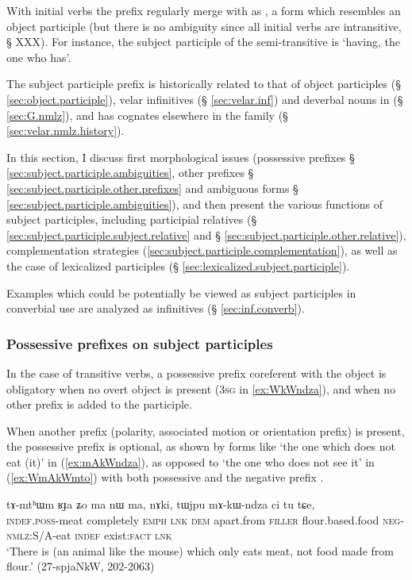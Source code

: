 With  initial verbs the  prefix regularly merge with  as , a form which resembles an object participle (but there is no ambiguity since all  initial verbs are intransitive, § XXX). For instance, the subject participle of the semi-transitive  is   `having, the one who has'.

The subject participle  prefix is historically related to that of object participles (§ \ref{sec:object.participle}), velar infinitives (§ \ref{sec:velar.inf}) and deverbal nouns in  (§ \ref{sec:G.nmlz}), and has cognates elsewhere in the family (§ \ref{sec:velar.nmlz.history}).

In this section, I discuss first morphological issues (possessive prefixes § \ref{sec:subject.participle.ambiguities}, other prefixes § \ref{sec:subject.participle.other.prefixes} and ambiguous forms § \ref{sec:subject.participle.ambiguities}), and then present the various functions of subject participles, including participial relatives (§ \ref{sec:subject.participle.subject.relative} and § \ref{sec:subject.participle.other.relative}), complementation strategies (\ref{sec:subject.participle.complementation}), as well as the case of lexicalized participles (§ \ref{sec:lexicalized.subject.participle}).
 
Examples which could be potentially be viewed as subject participles in converbial use are analyzed as  infinitives (§ \ref{sec:inf.converb}).

\subsubsection{Possessive prefixes on subject participles}  \label{sec:subject.participle.possessive}

In the case of transitive verbs, a possessive prefix coreferent with the object is obligatory when no overt object is present (\textsc{3sg}  in \ref{ex:WkWndza}), and when no other prefix is added to the participle.

When another prefix (polarity, associated motion or orientation prefix) is present, the possessive prefix is optional, as shown by forms like  `the one which does not eat (it)' in (\ref{ex:mAkWndza}), as opposed to  `the one who does not see it' in (\ref{ex:WmAkWmto}) with both possessive  and the negative prefix .

 \begin{exe} 
\ex \label{ex:mAkWndza}
\gll  tɤ-mtʰɯm ʁɟa ʑo ma nɯ ma, nɤki, tɯjpu mɤ-kɯ-ndza ci tu tɕe, \\
\textsc{indef}.\textsc{poss}-meat completely \textsc{emph} \textsc{lnk} \textsc{dem} apart.from \textsc{filler} flour.based.food \textsc{neg}-\textsc{nmlz}:S/A-eat \textsc{indef} exist:\textsc{fact} \textsc{lnk} \\
\glt  `There is (an animal like the mouse) which only eats meat, not food made from flour.' (27-spjaNkW, 202-2063)
\end{exe}

